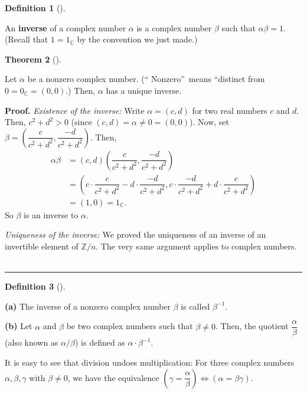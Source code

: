 \documentclass[numbers=enddot,12pt,final,onecolumn,notitlepage]{scrartcl}%
\numberwithin{exer}{subsection}
\theoremstyle{definition}
\newtheorem{theo}{Theorem}[subsection]
\newenvironment{theorem}[1][]
{\begin{theo}[#1]\begin{leftbar}}
{\end{leftbar}\end{theo}}
\newtheorem{defi}[theo]{Definition}
\newenvironment{definition}[1][]
{\begin{defi}[#1]\begin{leftbar}}
{\end{leftbar}\end{defi}}
\newenvironment{proof}[1][Proof]{\noindent\textbf{#1.} }{\ \rule{0.5em}{0.5em}}
\begin{document}
\begin{definition}
An \textbf{inverse} of a complex number $\alpha$ is a complex number $\beta$
such that $\alpha\beta=1$. (Recall that $1=1_{\mathbb{C}}$ by the convention
we just made.)
\end{definition}

\begin{theorem}
Let $\alpha$ be a nonzero complex number. (\textquotedblleft
Nonzero\textquotedblright\ means \textquotedblleft distinct from
$0=0_{\mathbb{C}}=\left(  0,0\right)  $.) Then, $\alpha$ has a unique inverse.
\end{theorem}

\begin{proof}
\textit{Existence of the inverse:} Write $\alpha=\left(  c,d\right)  $ for two
real numbers $c$ and $d$. Then, $c^{2}+d^{2}>0$ (since $\left(  c,d\right)
=\alpha\neq0=\left(  0,0\right)  $). Now, set $\beta=\left(  \dfrac{c}%
{c^{2}+d^{2}},\dfrac{-d}{c^{2}+d^{2}}\right)  $. Then,%
\begin{align*}
\alpha\beta & =\left(  c,d\right)  \left(  \dfrac{c}{c^{2}+d^{2}},\dfrac
{-d}{c^{2}+d^{2}}\right)  \\
& =\left(  c\cdot\dfrac{c}{c^{2}+d^{2}}-d\cdot\dfrac{-d}{c^{2}+d^{2}}%
,c\cdot\dfrac{-d}{c^{2}+d^{2}}+d\cdot\dfrac{c}{c^{2}+d^{2}}\right)  \\
& =\left(  1,0\right)  =1_{\mathbb{C}}.
\end{align*}
So $\beta$ is an inverse to $\alpha$.

\textit{Uniqueness of the inverse:} We proved the uniqueness of an inverse of
an invertible element of $\mathbb{Z}/n$. The very same argument applies to
complex numbers.
\end{proof}

\begin{definition}
\textbf{(a)} The inverse of a nonzero complex number $\beta$ is called
$\beta^{-1}$.

\textbf{(b)} Let $\alpha$ and $\beta$ be two complex numbers such that
$\beta\neq0$. Then, the quotient $\dfrac{\alpha}{\beta}$ (also known as
$\alpha/\beta$) is defined as $\alpha\cdot\beta^{-1}$.
\end{definition}

It is easy to see that division undoes multiplication: For three complex
numbers $\alpha,\beta,\gamma$ with $\beta\neq0$, we have the equivalence
$\left(  \gamma=\dfrac{\alpha}{\beta}\right)  \Longleftrightarrow\left(
\alpha=\beta\gamma\right)  $.
\end{document}
